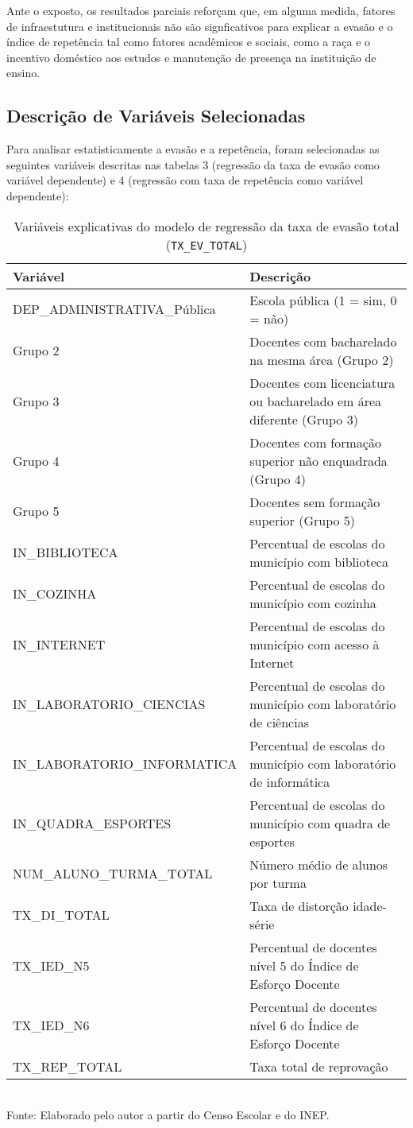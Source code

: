 \documentclass[english, spanish, brazilian]{RBIEarticle} %
\begin{document}
Ante o exposto, os resultados parciais reforçam que, em alguma medida, fatores de infraestutura e institucionais não são signficativos para explicar a evasão e o índice de repetência tal como fatores acadêmicos e sociais, como a raça e o incentivo doméstico aos estudos e manutenção de presença na instituição de ensino.

\subsection{Descrição de Variáveis Selecionadas}
Para analisar estatisticamente a evasão e a repetência, foram selecionadas as seguintes variáveis descritas nas tabelas 3 (regressão da taxa de evasão como variável dependente) e 4 (regressão com taxa de repetência como variável dependente):

\begin{table}[htbp]
\centering
\caption{Variáveis explicativas do modelo de regressão da taxa de evasão total (\texttt{TX\_EV\_TOTAL})}
\label{tab:variaveis_tx_ev}
\small
\begin{tabular}{lp{9cm}}
\hline
\textbf{Variável} & \textbf{Descrição} \\
\hline
DEP\_ADMINISTRATIVA\_Pública & Escola pública (1 = sim, 0 = não) \\
Grupo 2 & Docentes com bacharelado na mesma área (Grupo 2) \\
Grupo 3 & Docentes com licenciatura ou bacharelado em área diferente (Grupo 3) \\
Grupo 4 & Docentes com formação superior não enquadrada (Grupo 4) \\
Grupo 5 & Docentes sem formação superior (Grupo 5) \\
IN\_BIBLIOTECA & Percentual de escolas do município com biblioteca \\
IN\_COZINHA & Percentual de escolas do município com cozinha \\
IN\_INTERNET & Percentual de escolas do município com acesso à Internet \\
IN\_LABORATORIO\_CIENCIAS & Percentual de escolas do município com laboratório de ciências \\
IN\_LABORATORIO\_INFORMATICA & Percentual de escolas do município com laboratório de informática \\
IN\_QUADRA\_ESPORTES & Percentual de escolas do município com quadra de esportes \\
NUM\_ALUNO\_TURMA\_TOTAL & Número médio de alunos por turma \\
TX\_DI\_TOTAL & Taxa de distorção idade-série \\
TX\_IED\_N5 & Percentual de docentes nível 5 do Índice de Esforço Docente \\
TX\_IED\_N6 & Percentual de docentes nível 6 do Índice de Esforço Docente \\
TX\_REP\_TOTAL & Taxa total de reprovação \\
\hline
\end{tabular}
\\[2mm]
\footnotesize Fonte: Elaborado pelo autor a partir do Censo Escolar e do INEP.
\end{table}
\end{document}
